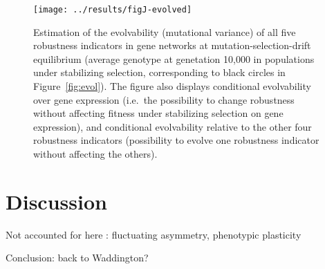 \documentclass[a4paper]{article}
\begin{document}
\begin{figure}[t]
\begin{center}
\texttt{[image: ../results/figJ-evolved]}
\caption{\label{fig:evolvability} Estimation of the evolvability (mutational variance) of all five robustness indicators in gene networks at mutation-selection-drift equilibrium (average genotype at genetation 10,000 in populations under stabilizing selection, corresponding to black circles in Figure~\ref{fig:evol}). The figure also displays conditional evolvability over gene expression (i.e.\ the possibility to change robustness without affecting fitness under stabilizing selection on gene expression), and conditional evolvability relative to the other four robustness indicators (possibility to evolve one robustness indicator without affecting the others). }
\end{center}
\end{figure}


\section{Discussion}

Not accounted for here : fluctuating asymmetry, phenotypic plasticity

Conclusion: back to Waddington? 


\printbibliography




\clearpage
\end{document}
